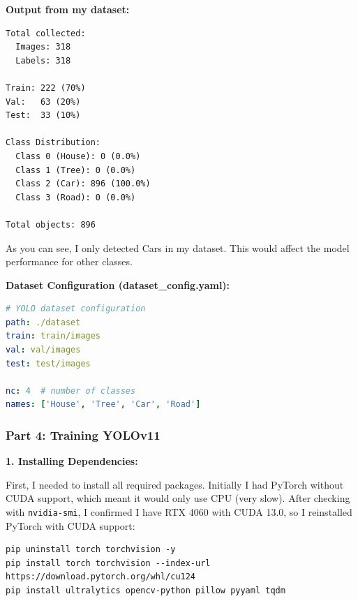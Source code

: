 \textbf{Output from my dataset:}
\begin{verbatim}
Total collected:
  Images: 318
  Labels: 318

Train: 222 (70%)
Val:   63 (20%)
Test:  33 (10%)

Class Distribution:
  Class 0 (House): 0 (0.0%)
  Class 1 (Tree): 0 (0.0%)
  Class 2 (Car): 896 (100.0%)
  Class 3 (Road): 0 (0.0%)

Total objects: 896
\end{verbatim}

As you can see, I only detected Cars in my dataset. This would affect the model performance for other classes.

\textbf{Dataset Configuration (dataset\_config.yaml):}
\begin{lstlisting}[language=YAML]
# YOLO dataset configuration
path: ./dataset
train: train/images
val: val/images
test: test/images

nc: 4  # number of classes
names: ['House', 'Tree', 'Car', 'Road']
\end{lstlisting}

\subsubsection{Part 4: Training YOLOv11}

\textbf{1. Installing Dependencies:}

First, I needed to install all required packages. Initially I had PyTorch without CUDA support, which meant it would only use CPU (very slow). After checking with \texttt{nvidia-smi}, I confirmed I have RTX 4060 with CUDA 13.0, so I reinstalled PyTorch with CUDA support:

\begin{verbatim}
pip uninstall torch torchvision -y
pip install torch torchvision --index-url https://download.pytorch.org/whl/cu124
pip install ultralytics opencv-python pillow pyyaml tqdm
\end{verbatim}


